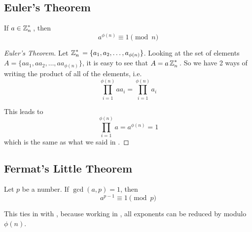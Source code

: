 \subsection{Euler's Theorem}\label{subsec:Eulers_Theorem}
\begin{theorem}\label{thm:Eulers_Theorem}
  If $a \in \operatorname{\mathbb{Z}}_{n}^{*}{}$, then
  \begin{equation}\label{eq:Eulers_Theorem}
    a^{\phi(n)} \equiv 1 \pmod{n}
  \end{equation}
\end{theorem}

\begin{proof}[Euler's Theorem]\label{proof:Eulers_Theorem}
  Let $\operatorname{\mathbb{Z}}_{n}^{*}{} = \lbrace a_{1}, a_{2}, \ldots, a_{\phi(n)} \rbrace$.
  Looking at the set of elements $A = \lbrace aa_{1}, aa_{2}, \ldots, aa_{\phi(n)} \rbrace$, it is easy to see that $A = a \operatorname{\mathbb{Z}}_{n}^{*}{}$.
  So we have 2 ways of writing the product of all of the elements, i.e.
  \begin{equation*}
    \prod\limits_{i=1}^{\phi(n)} a a_{i} = \prod\limits_{i=1}^{\phi(n)} a_{i}
  \end{equation*}
  
  This leads to
  \begin{equation*}
    \prod\limits_{i=1}^{\phi(n)} a = a^{\phi(n)} = 1
  \end{equation*}
  which is the same as what we said in .
\end{proof}

\subsection{Fermat's Little Theorem}\label{subsec:Fermats_Little_Theorem}
\begin{theorem}\label{thm:Fermats_Little_Theorem}
  Let $p$ be a  number.
  If $\gcd(a, p) = 1$, then
  \begin{equation}\label{eq:Fermats_Little_Theorem}
    a^{p-1} \equiv 1 \pmod{p}
  \end{equation}
\end{theorem}
\begin{remark*}
  This ties in with , because working in \TextIntsModN{}, all exponents can be reduced by modulo $\phi(n)$.
\end{remark*}

